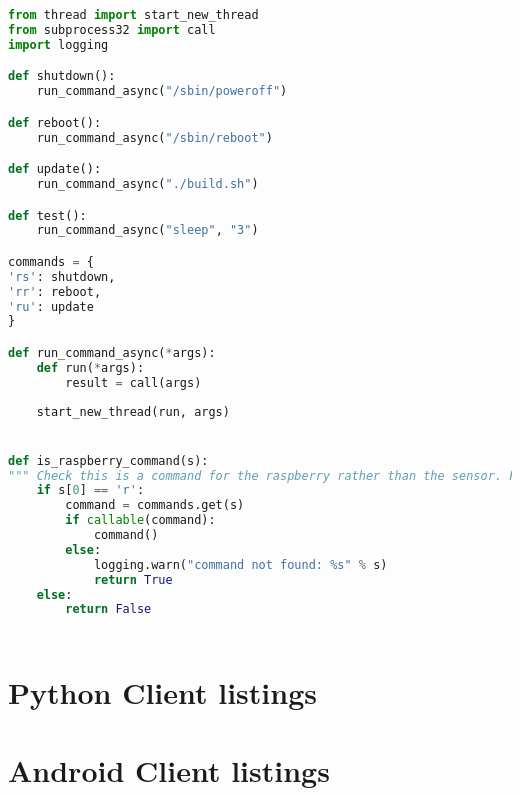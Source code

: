 \documentclass[hidelinks,11pt,a4paper,oneside,article]{memoir}
\begin{document}
\begin{lstlisting}[label={listing:rpi-subprocess},caption={Subprocess example},language=Python, style=styleprogrammingappendix]
from thread import start_new_thread
from subprocess32 import call
import logging

def shutdown():
    run_command_async("/sbin/poweroff")

def reboot():
    run_command_async("/sbin/reboot")

def update():
    run_command_async("./build.sh")

def test():
    run_command_async("sleep", "3")

commands = {
'rs': shutdown,
'rr': reboot,
'ru': update
}

def run_command_async(*args):
    def run(*args):
        result = call(args)
    
    start_new_thread(run, args)


def is_raspberry_command(s):
""" Check this is a command for the raspberry rather than the sensor. First letter must be an 'r'"""
    if s[0] == 'r':
        command = commands.get(s)
        if callable(command):
            command()
        else:
            logging.warn("command not found: %s" % s)
            return True
    else:
        return False



\end{lstlisting}\vspace{14pt}

\clearpage
{}

\chapter{Python Client listings}\label{appx:pythonclient}



\clearpage
{}

\chapter{Android Client listings}\label{appx:androidclient}
\end{document}
